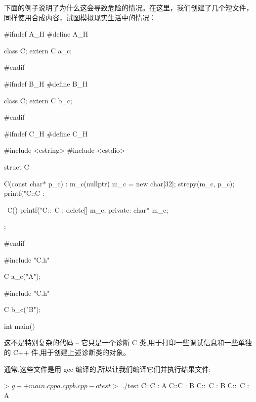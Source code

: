 下面的例子说明了为什么这会导致危险的情况。在这里，我们创建了几个短文件，同样使用合成内容，试图模拟现实生活中的情况：


\begin{cpp}
#ifndef A_H
#define A_H

class C;
extern C a_c;

#endif
\end{cpp}


\begin{cpp}
#ifndef B_H
#define B_H

class C;
extern C b_c;

#endif
\end{cpp}


\begin{cpp}
#ifndef C_H
#define C_H

#include <cstring>
#include <cstdio>

struct C {
  C(const char* p_c) : m_c(nullptr) {
    m_c = new char[32];
    strcpy(m_c, p_c);
    printf("C::C : %
  }

  ~C() {
    printf("C::~C : %
    delete[] m_c;
  }
private:
  char* m_c;
};

#endif
\end{cpp}


\begin{cpp}
#include "C.h"

C a_c("A");
\end{cpp}


\begin{cpp}
#include "C.h"

C b_c("B");
\end{cpp}


\begin{cpp}
int main()
{ 
}
\end{cpp}

这不是特别复杂的代码 – 它只是一个诊断 C 类,用于打印一些调试信息和一些单独的 C++ 件,用于创建上述诊断类的对象。

通常,这些文件是用 gcc 编译的,所以让我们编译它们并执行结果文件:

\begin{shell}
> $ g++ main.cpp a.cpp b.cpp -o test
> $ ./test
C::C : A
C::C : B
C::~C : B
C::~C : A
\end{shell}

